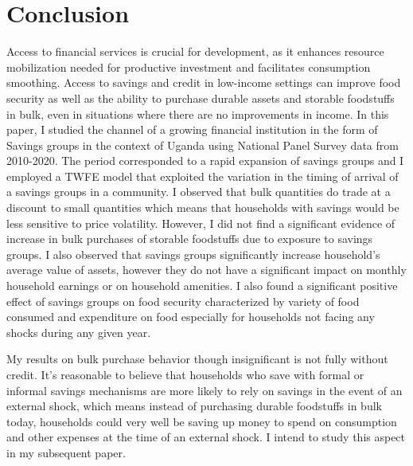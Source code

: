 \documentclass[12pt]{article}
\begin{document}
{\clearpage


\section{Conclusion}\label{sec:conclusion}

\hspace{1cm} Access to financial services is crucial for development, as it enhances resource mobilization needed for productive investment  and facilitates consumption smoothing. Access to savings and credit in low-income settings can improve food security as well as the ability to purchase durable assets and storable foodstuffs in bulk, even in situations where there are no improvements in income. In this paper, I studied the channel of a growing financial institution in the form of Savings groups in the context of Uganda using National Panel Survey data from 2010-2020. The period corresponded to a rapid expansion of savings groups and I employed a TWFE model that exploited the variation in the timing of arrival of a savings groups in a community. I observed that bulk quantities do trade at a discount to small quantities which means that households with savings would be less sensitive to price volatility. However, I did not find a significant evidence of increase in bulk purchases of storable foodstuffs due to exposure to savings groups. I also observed that savings groups significantly increase household’s average value of assets, however they do not have a significant impact on monthly household earnings or on household amenities. I also found a significant positive effect of savings groups on food security characterized by variety of food consumed and expenditure on food especially for households not facing any shocks during any given year.

\hspace{1cm} My results on bulk purchase behavior though insignificant is not fully without credit. It's reasonable to believe that households who save with formal or informal savings mechanisms are more likely to rely on savings in the event of an external shock, which means instead of purchasing durable foodstuffs in bulk today, households could very well be saving up money to spend on consumption and other expenses at the time of an external shock. I intend to study this aspect in my subsequent paper. 

}
\end{document}
